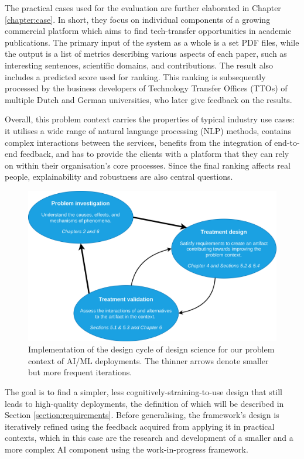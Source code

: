 The practical cases used for the evaluation are further elaborated in Chapter \ref{chapter:case}. In short, they focus on individual components of a growing commercial platform which aims to find tech-transfer opportunities in academic publications. The primary input of the system as a whole is a set PDF files, while the output is a list of metrics describing various aspects of each paper, such as interesting sentences, scientific domains, and contributions. The result also includes a predicted score used for ranking. This ranking is subsequently processed by the business developers of Technology Transfer Offices (TTOs) of multiple Dutch and German universities, who later give feedback on the results.

Overall, this problem context carries the properties of typical industry use cases: it utilises a wide range of natural language processing (NLP) methods, contains complex interactions between the services, benefits from the integration of end-to-end feedback, and has to provide the clients with a platform that they can rely on within their organisation's core processes. Since the final ranking affects real people, explainability and robustness are also central questions.

\begin{figure}
    \centering
    \includegraphics[width=.9\linewidth]{figures/design-cycle.drawio.png}
    \captionsetup{width=.9\linewidth}
    \caption{Implementation of the design cycle of design science \cite{wieringa2014design} for our problem context of AI/ML deployments. The thinner arrows denote smaller but more frequent iterations.}
    \label{fig:design-cycle}
\end{figure}

The goal is to find a simpler, less cognitively-straining-to-use design that still leads to high-quality deployments, the definition of which will be described in Section \ref{section:requirements}. Before generalising, the framework's design is iteratively refined using the feedback acquired from applying it in practical contexts, which in this case are the research and development of a smaller and a more complex AI component using the work-in-progress framework. 

